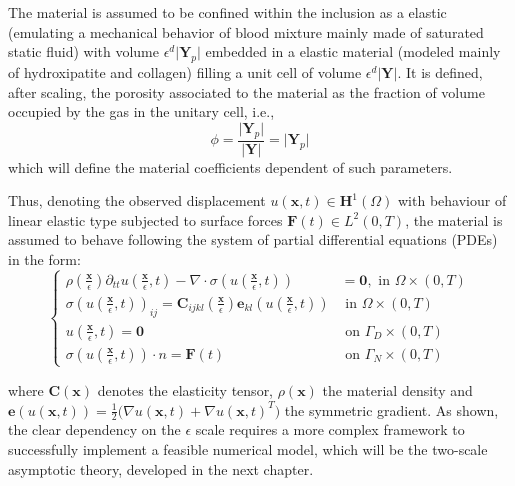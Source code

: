 \begin{rem}
The material is assumed to be confined within the inclusion as a elastic (emulating a mechanical behavior of blood mixture mainly made of saturated static fluid) with volume $\epsilon^d \vert \mathbf{Y}_p \vert$ embedded in a elastic material (modeled mainly of hydroxipatite and collagen) filling a unit cell of volume $\epsilon^d \vert \mathbf{Y} \vert$.
It is defined, after scaling, the porosity associated to the material as the fraction of volume occupied by the gas in the unitary cell, i.e., 
\begin{equation*}
\phi = \frac{\vert \mathbf{Y}_p \vert}{\vert \mathbf{Y} \vert} = \vert \mathbf{Y}_p \vert
\end{equation*}
which will define the material coefficients dependent of such parameters.
\end{rem}

Thus, denoting the observed displacement $u(\mathbf{x},t) \in \mathbf{H}^1(\Omega)$ with behaviour of linear elastic type subjected to surface forces $\mathbf{F}(t) \in L^2 (0, T)$, the material is assumed to behave following the system of partial differential equations (PDEs) in the form:
\begin{equation*}
    \left \{
    \begin{aligned}
        \rho (\frac{\mathbf{x}}{\epsilon}) \partial_{tt} u(\frac{\mathbf{x}}{\epsilon},t) - \nabla \cdot \sigma (u(\frac{\mathbf{x}}{\epsilon},t)) & = \mathbf{0}, \text{ in } \Omega \times (0, T) \\
        \sigma(u(\frac{\mathbf{x}}{\epsilon},t))_{ij} = \mathbf{C}_{ijkl}(\frac{\mathbf{x}}{\epsilon}) \mathbf{e}_{kl}(u(\frac{\mathbf{x}}{\epsilon},t)) & \text{ in } \Omega \times (0, T) \\
        u(\frac{\mathbf{x}}{\epsilon},t) = \mathbf{0} & \text{ on } \Gamma_D \times (0, T) \\
    \sigma(u(\frac{\mathbf{x}}{\epsilon},t)) \cdot n = \mathbf{F}(t) & \text{ on } \Gamma_N \times (0,T)
    \end{aligned}
    \right .
\end{equation*}

where $\mathbf{C}(\mathbf{x})$ denotes the elasticity tensor, $\rho(\mathbf{x})$ the material density and $\mathbf{e}(u(\mathbf{x},t)) = \frac{1}{2}\big( \nabla u(\mathbf{x},t) + \nabla u(\mathbf{x},t)^{T}\big)$ the symmetric gradient. As shown, the clear dependency on the $\epsilon$ scale requires a more complex framework to successfully implement a feasible numerical model, which will be the two-scale asymptotic theory, developed in the next chapter.


